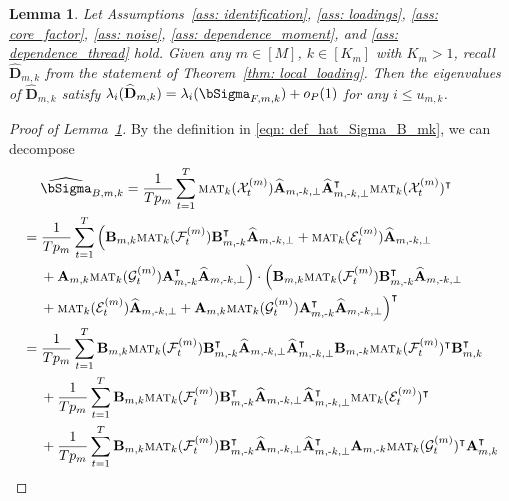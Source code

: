\documentclass[aos]{imsart}
\theoremstyle{plain}
\newtheorem{lemma}[theorem]{Lemma}
\theoremstyle{definition}
\def\mat{\textnormal{\textsc{mat}}}
\def\wh#1{\widehat{#1}}
\def\cE{\mathcal{E}}
\def\cF{\mathcal{F}}
\def\cG{\mathcal{G}} \def\cH{\boldsymbol{\mathcal{H}}} \def\cI{\mathcal{I}}
\def\cX{\mathcal{X}}
\def\bA{\mathbf{A}}
\def\bB{\mathbf{B}}
\def\bD{\mathbf{D}}
\def\trans{\intercal}
\begin{document}
\begin{lemma}\label{lemma: eigenvalue_Sigma_B}
Let Assumptions~\ref{ass: identification}, \ref{ass: loadings}, \ref{ass: core_factor}, \ref{ass: noise}, \ref{ass: dependence_moment}, and \ref{ass: dependence_thread} hold.
Given any $m\in[M]$, $k\in[K_m]$ with $K_m> 1$, recall $\wh{\bD}_{m,k}$ from the statement of Theorem~\ref{thm: local_loading}.
Then the eigenvalues of $\wh{\bD}_{m,k}$ satisfy $\lambda_i(\wh{\bD}_{m,k}) = \lambda_i(\bSigma_{F,m,k}) + o_P(1)$ for any $i\leq u_{m,k}$.
\end{lemma}


\begin{proof}[Proof of Lemma~\ref{lemma: eigenvalue_Sigma_B}]
By the definition in \eqref{eqn: def_hat_Sigma_B_mk}, we can decompose
\begin{align}
    &\;\quad
    \wh\bSigma_{B,m,k} = \frac{1}{Tp_m} \sum_{t=1}^T \mat_k(\cX_t^{(m)}) \wh{\bA}_{m,\text{-}k,\perp} \wh{\bA}_{m,\text{-}k,\perp}^\trans \mat_k(\cX_t^{(m)})^\trans \notag \\
    &=
    \frac{1}{Tp_m} \sum_{t=1}^T \Big( \bB_{m,k} \mat_k(\cF_t^{(m)}) \bB_{m,\text{-}k}^\trans \wh{\bA}_{m,\text{-}k,\perp} + \mat_k(\cE_t^{(m)}) \wh{\bA}_{m,\text{-}k,\perp} \notag \\
    &\;\quad
    + \bA_{m,k} \mat_k(\cG_t^{(m)}) \bA_{m,\text{-}k}^\trans \wh{\bA}_{m,\text{-}k,\perp} \Big) 
    \cdot \Big( \bB_{m,k} \mat_k(\cF_t^{(m)}) \bB_{m,\text{-}k}^\trans \wh{\bA}_{m,\text{-}k,\perp} \notag \\
    &\;\quad
    + \mat_k(\cE_t^{(m)}) \wh{\bA}_{m,\text{-}k,\perp} + \bA_{m,k} \mat_k(\cG_t^{(m)}) \bA_{m,\text{-}k}^\trans \wh{\bA}_{m,\text{-}k,\perp} \Big)^\trans \notag \\
    &=
    \frac{1}{Tp_m} \sum_{t=1}^T \bB_{m,k} \mat_k(\cF_t^{(m)}) \bB_{m,\text{-}k}^\trans \wh{\bA}_{m,\text{-}k,\perp} \wh{\bA}_{m,\text{-}k,\perp}^\trans \bB_{m,\text{-}k} \mat_k(\cF_t^{(m)})^\trans \bB_{m,k}^\trans \notag \\
    &\;\quad
    + \frac{1}{Tp_m} \sum_{t=1}^T \bB_{m,k} \mat_k(\cF_t^{(m)}) \bB_{m,\text{-}k}^\trans \wh{\bA}_{m,\text{-}k,\perp} \wh{\bA}_{m,\text{-}k,\perp}^\trans \mat_k(\cE_t^{(m)})^\trans \notag \\
    &\;\quad
    + \frac{1}{Tp_m} \sum_{t=1}^T \bB_{m,k} \mat_k(\cF_t^{(m)}) \bB_{m,\text{-}k}^\trans \wh{\bA}_{m,\text{-}k,\perp} \wh{\bA}_{m,\text{-}k,\perp}^\trans \bA_{m,\text{-}k} \mat_k(\cG_t^{(m)})^\trans \bA_{m,k}^\trans \notag \\

\end{align}
\end{proof}
\end{document}
